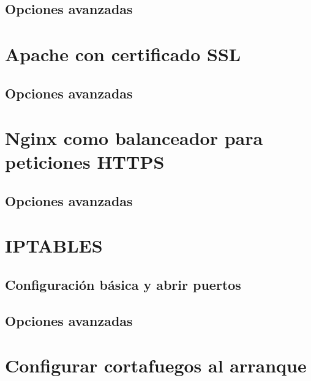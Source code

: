 \section{Opciones avanzadas}



\chapter{Apache con certificado SSL}



\section{Opciones avanzadas}



\chapter{Nginx como balanceador para peticiones HTTPS}



\section{Opciones avanzadas}



\chapter{IPTABLES}



\section{Configuración básica y abrir puertos}



\section{Opciones avanzadas}



\chapter{Configurar cortafuegos al arranque}

